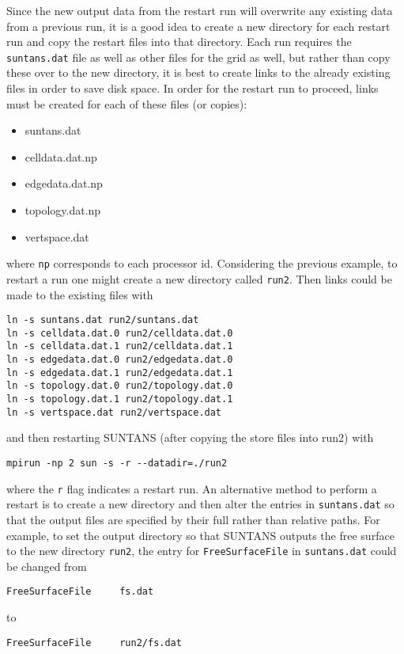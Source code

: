 \documentclass[12pt,oneside]{article}
\begin{document}
Since the new output data from the restart run will overwrite any existing data from a previous run, it is
a good idea to create a new directory for each restart run and copy the restart files into that directory.
Each run requires the \verb+suntans.dat+ file as well as other files for the grid as well, but rather than
copy these over to the new directory, it is best to create links to the already existing files in order
to save disk space.  In order for the restart run to proceed, links must be created for each of these
files (or copies):
\begin{itemize}
\item suntans.dat
\item celldata.dat.np
\item edgedata.dat.np
\item topology.dat.np
\item vertspace.dat
\end{itemize}
where \verb+np+ corresponds to each processor id.  Considering the previous example, to restart a run
one might create a new directory called \verb+run2+.  Then links could be made to the existing files 
with
\begin{verbatim}
ln -s suntans.dat run2/suntans.dat
ln -s celldata.dat.0 run2/celldata.dat.0
ln -s celldata.dat.1 run2/celldata.dat.1
ln -s edgedata.dat.0 run2/edgedata.dat.0
ln -s edgedata.dat.1 run2/edgedata.dat.1
ln -s topology.dat.0 run2/topology.dat.0
ln -s topology.dat.1 run2/topology.dat.1
ln -s vertspace.dat run2/vertspace.dat
\end{verbatim}
and then restarting SUNTANS (after copying the store files into run2) with
\begin{verbatim}
mpirun -np 2 sun -s -r --datadir=./run2
\end{verbatim}
where the \verb+r+ flag indicates a restart run.  An alternative method to perform a restart
is to create a new directory and then alter the entries in \verb+suntans.dat+ so that the
output files are specified by their full rather than relative paths.  For example, to set
the output directory so that SUNTANS outputs the free surface to the new directory \verb+run2+,
the entry for \verb+FreeSurfaceFile+ in \verb+suntans.dat+ could be changed from
\begin{verbatim}
FreeSurfaceFile   	fs.dat
\end{verbatim}
to
\begin{verbatim}
FreeSurfaceFile   	run2/fs.dat
\end{verbatim}
\end{document}
